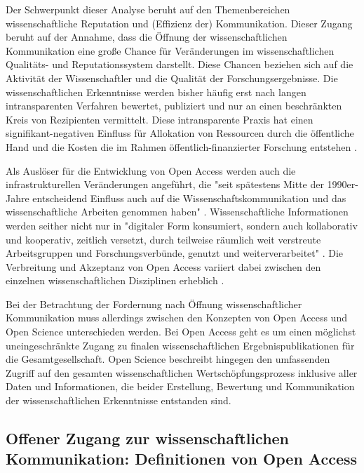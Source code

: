 Der Schwerpunkt dieser Analyse beruht auf den Themenbereichen wissenschaftliche Reputation und (Effizienz der) Kommunikation. Dieser Zugang beruht auf der Annahme, dass die Öffnung der wissenschaftlichen Kommunikation eine große Chance für Veränderungen im wissenschaftlichen Qualitäts- und Reputationssystem darstellt. Diese Chancen beziehen sich auf die Aktivität der Wissenschaftler und die Qualität der Forschungsergebnisse. Die wissenschaftlichen Erkenntnisse werden bisher häufig erst nach langen intransparenten Verfahren bewertet, publiziert und nur an einen beschränkten Kreis von Rezipienten vermittelt. Diese intransparente Praxis hat einen signifikant-negativen Einfluss für Allokation von Ressourcen durch die öffentliche Hand und die Kosten die im Rahmen öffentlich-finanzierter Forschung entstehen \cite{suchen}.

Als Auslöser für die Entwicklung von Open Access werden auch die infrastrukturellen Veränderungen angeführt, die "seit spätestens Mitte der 1990er-Jahre entscheidend Einfluss auch auf die Wissenschaftskommunikation und das wissenschaftliche Arbeiten genommen haben" \cite{schulze_2013_open}. Wissenschaftliche Informationen werden seither nicht nur in "digitaler Form konsumiert, sondern auch kollaborativ und kooperativ, zeitlich versetzt, durch teilweise räumlich weit verstreute Arbeitsgruppen und Forschungsverbünde, genutzt und weiterverarbeitet" \cite{schulze_2013_open}. Die Verbreitung und Akzeptanz von Open Access variiert dabei zwischen den einzelnen wissenschaftlichen Disziplinen erheblich \cite{cite:21a}.

Bei der Betrachtung der Fordernung nach Öffnung wissenschaftlicher Kommunikation muss allerdings zwischen den Konzepten von Open Access und Open Science unterschieden werden. Bei Open Access geht es um einen möglichst uneingeschränkte Zugang zu finalen wissenschaftlichen Ergebnispublikationen für die Gesamtgesellschaft. Open Science beschreibt hingegen den umfassenden Zugriff auf den gesamten wissenschaftlichen Wertschöpfungsprozess inklusive aller Daten und Informationen, die beider Erstellung, Bewertung und Kommunikation der wissenschaftlichen Erkenntnisse entstanden sind.

\subsection{Offener Zugang zur wissenschaftlichen Kommunikation: Definitionen von Open Access}

